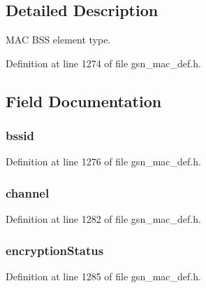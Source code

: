 \subsection{Detailed Description}
MAC BSS element type. 

Definition at line 1274 of file gsn\_\-mac\_\-def.h.



\subsection{Field Documentation}
\hypertarget{a00110_a0c8072b3bb52f68906a0aacd382de7c2}{
\subsubsection[{bssid}]{ {\bf bssid}}}
\label{a00110_a0c8072b3bb52f68906a0aacd382de7c2}


Definition at line 1276 of file gsn\_\-mac\_\-def.h.

\hypertarget{a00110_a52d69a3bd7bdfdfc6f9e40f4962c575d}{
\subsubsection[{channel}]{ {\bf channel}}}
\label{a00110_a52d69a3bd7bdfdfc6f9e40f4962c575d}


Definition at line 1282 of file gsn\_\-mac\_\-def.h.

\hypertarget{a00110_a90e79645daccb077a9e5395b430296c7}{
\subsubsection[{encryptionStatus}]{ {\bf encryptionStatus}}}
\label{a00110_a90e79645daccb077a9e5395b430296c7}


Definition at line 1285 of file gsn\_\-mac\_\-def.h.

